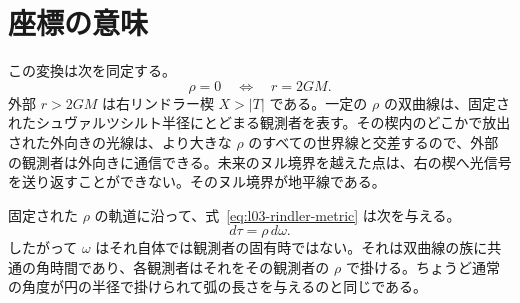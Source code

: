 \begin{classroomqa}
\end{classroomqa}

\section{座標の意味}

この変換は次を同定する。
\begin{equation}
\rho=0\quad\Longleftrightarrow\quad r=2GM.
\end{equation}
外部 \(r>2GM\) は右リンドラー楔 \(X>|T|\) である。一定の \(\rho\) の双曲線は、固定されたシュヴァルツシルト半径にとどまる観測者を表す。その楔内のどこかで放出された外向きの光線は、より大きな \(\rho\) のすべての世界線と交差するので、外部の観測者は外向きに通信できる。未来のヌル境界を越えた点は、右の楔へ光信号を送り返すことができない。そのヌル境界が地平線である。

\begin{classroomqa}
\end{classroomqa}

\begin{classroomqa}
\end{classroomqa}

固定された \(\rho\) の軌道に沿って、式~\eqref{eq:l03-rindler-metric} は次を与える。
\begin{equation}
d\tau=\rho\,d\omega.
\label{eq:l03-proper-time-rindler}
\end{equation}
したがって \(\omega\) はそれ自体では観測者の固有時ではない。それは双曲線の族に共通の角時間であり、各観測者はそれをその観測者の \(\rho\) で掛ける。ちょうど通常の角度が円の半径で掛けられて弧の長さを与えるのと同じである。

